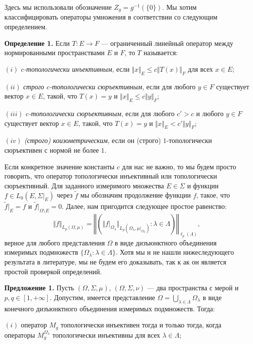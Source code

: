 \documentclass[11pt,twoside]{article}
\begin{document}
Здесь мы использовали обозначение $Z_g=g^{-1}(\{0\})$. Мы хотим классифицировать
операторы умножения в соответствии со следующим определением.

\textbf{Определение 1.} Если $ T:E\to F$ --- ограниченный линейный оператор
между нормированными пространствами $E$ и $F$, то $ T$ называется:

$(i)$ \textit{$c$-топологически инъективным}, если $\Vert x\Vert_E\leq c\Vert
    T(x)\Vert_F$ для всех $x \in E$;

$(ii)$ \textit{строго $c$-топологически сюръективным}, если для любого $y\in F$
существует вектор $x \in E$, такой, что $ T(x) = y$ и $\Vert x \Vert_E \leq c
    \Vert y \Vert_F$;

$(iii)$ \textit{$c$-топологически сюръективным}, если для любого $c'>c$ и любого
$y\in F$ существует вектор $x \in E$, такой, что $ T(x) = y$ и $\Vert x \Vert_E
    < c' \Vert y \Vert_F$;

$(iv)$ \textit{(строго) коизометрическим}, если он (строго) $1$-топологически
сюръективен с нормой не более $1$.


Если конкретное значение константы $c$ для нас не важно, то мы будем просто
говорить, что оператор топологически инъективный или топологически сюръективный.
Для заданного измеримого множества $E\in \Sigma$ и функции $f\in
    L_0(E,\Sigma|_{E})$ через $\widetilde{f}$ мы обозначим продолжение функции $f$,
такое, что $\widetilde{f}|_E=f$ и $\widetilde{f}|_{\Omega\setminus E}=0$. Далее,
нам пригодится следующее простое равенство:
$$
    \Vert f\Vert_{L_p(\Omega,\mu)}
    =\left\Vert\left(
    \Vert f|_{\Omega_\lambda}\Vert_{L_p(\Omega_\lambda,\mu|_{\Omega_\lambda})}:
    \lambda\in\Lambda
    \right)\right\Vert_{\ell_p(\Lambda)},
$$
верное для любого представления $\Omega$ в виде дизъюнктного объединения
измеримых подмножеств $\{\Omega_\lambda:\lambda\in\Lambda \}$. Хотя мы и не
нашли нижеследующего результата в литературе, мы не будем его доказывать, так к
ак он является простой проверкой определений.

\textbf{Предложение 1.} Пусть $(\Omega,\Sigma,\mu)$, $(\Omega,\Sigma,\nu)$ ---
два пространства с мерой и $p,q\in[1,+\infty]$. Допустим, имеется представление
$\Omega=\bigcup_{\lambda\in\Lambda}\Omega_\lambda$ в виде конечного дизъюнктного
объединения измеримых подмножеств. Тогда:

$(i)$ оператор $M_g$ топологически инъективен тогда и только тогда, когда
операторы $M_g^{\Omega_\lambda}$ топологически инъективны для всех
$\lambda\in\Lambda$;
\end{document}

